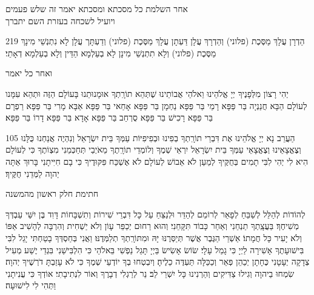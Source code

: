 \clearpage

\centerlastline
{
\small
\parskip 1pt
{\centering
  \scriptsize
   אחר השלמת כל מסכתא ומסכתא יאמר זה שלש פעמים\\ ויועיל לשכחה בעזרת השם יתברך\hdot
}

\begin{tp}{219}
הַדְרָן עֲלָךְ מַסֶּכֶת {\scriptsize(פלוני)} וְהַדְרָךְ עֲלָן\hdot
דַּעְתָן עֲלָךְ מַסֶּכֶת {\scriptsize(פלוני)} וְדַעְתָּך עֲלָן\hdot
לָא נִתְנְשֵׁי מִינָךְ מַסֶּכֶת {\scriptsize(פלוני}) וְלָא תִתְנְשֵׁי מִינָן
לָא בְעַלְמָא הַדֵּין וְלָא בְעַלְמָא דְאָתֵי׃
\end{tp}

{\scriptsize ואחר כל יאמר}

יְהִי רָצוֹן מִלְּפָנֶיךָ יְיָ אֱלֹהֵינוּ וֵאלֹהֵי אֲבוֹתֵינוּ שֶׁתְּהֵא תוֹרָֽתְךָ אוּמָנוּתֵנוּ בָּעוֹלָם הַזֶּה וּתְהֵא עִמָּנו לְעוֹלָם הַבָּא\hdot
חֲנַנְיָה בַּר פַּפָּא\hdot
רָמֵי בַּר פַּפָּא\hdot
נַחְמָן בַּר פַּפָּא\hdot
אָחַאי בַּר פַּפָּא\hdot
אַבָּא מָרִי בַּר פַּפָּא\hdot
רַפְרָם בַּר פַּפָּא\hdot
רָכִישׁ בַּר פַּפָּא\hdot
סֻרְחַב בַּר פַּפָּא\hdot
אָדָא בַּר פַּפָּא\hdot
דָרוֹ בַּר פַּפָּא׃

\begin{tp}{105}
הַעֲרֵב נָא יְיָ אֱלֹהֵינוּ אֶת דִּבְרֵי תוֹרָֽתְךָ בְפִינוּ וּבְפִיפִיּוֹת עַמְּךָ בֵּית יִשְׂרָאֵל וְנִהְיֶה אֲנַחְנוּ כֻּלָּנוּ וְצֶאֱצָאֵינוּ וְצֶאֱצָאֵי עַמְּךָ בֵּית יִשְׂרָאֵל יִרְאֵי שְׁמֶךָ וְלוֹמְדֵי תוֹרָֽתֶךָ\hdot
 מֵאֹיְבַי תְּחַכְּמֵנִי מִצְו‍ֹתֶךָ כִּי לְעוֹלָם הִיא לִי\hdot
 יְהִי לִבִּי תָמִים בְּחֻקֶּיךָ לְמַעַן לֹא אֵבוֹשׁ\hdot
 לְעוֹלָם לֹא אֶשְׁכַּח פִּקּוּדֶיךָ כִּי בָם חִיִּיתָנִי\hdot
  בָּרוּךְ אַתָּה יְהוָה לַמְּדֵנִי חֻקֶּיךָ׃
\end{tp}
  
    {\centering
      \larger חתימת חלק ראשון מהמשנה

    }

    לְהוֹדוֹת לְהַלֵּל לְשַׁבֵּחַ לְפָאֵר לְרוֹמֵם לְהַדֵּר וּלְנַצֵּחַ עַל כָּל דִּבְרֵי שִׁירוֹת וְתִשְׁבָּחוֹת דָּוִד בֶּן יִשַּׁי עַבְדְּךָ מְשִׁיחֶךָ׃ בַּעֲצָֽתְךָ תַנְחֵנִי וְאַחַר כָּבוֹד תִּקָּחֵנִי׃
    וְהוּא רַחוּם יְכַפֵּר עָו‍ֹן וְלֹא יַשְׁחִית וְהִרְבָּה לְהָשִׁיב אַפּוֹ וְלֹא יָעִיר כָּל חֲמָתוֹ׃
    אַשְׁרֵי הַגֶּבֶר אֲשֶׁר תְּיַסְּרֶנּוּ יָּהּ וּמִתּוֹרָֽתְךָ תְלַמְּדֶנּוּ׃
    וַאֲנִי בְּחַסְדְּךָ בָטַחְתִּי יָגֵל לִבִּי בִּישׁוּעָתֶךָ אָשִׁירָה לַיְיָ כִּי גָמַל עָלָי׃
    שׂוֹשׂ אָשִׂישׂ בַּיְיָ תָּגֵל נַפְשִׁי בֵּאלֹהַי כִּי הִלְבִּישַׁנִי בִּגְדֵי יֶשַׁע מְעִיל צְדָקָה יְעָטָנִי כֶּחָתָן יְכַהֵן פְּאֵר וְכַכַּלָּה תַּעְדֶּה כֵלֶיהָ׃
    וְיִבְטְחוּ בְךָ יוֹדְעֵי שְׁמֶךָ כִּי לֹא עָזַבְתָּ דֹרְשֶׁיךָ יְהוָה׃
    שִׂמְחוּ בַיהוָה וְגִילוּ צַדִּיקִים וְהַרְנִינוּ כָּל יִשְׁרֵי לֵב׃
    נֵר לְרַגְלִי דְבָרֶךָ וְאוֹר לִנְתִיבָתִי׃
    אוֹדְךָ כִּי עֲנִיתָנִי וַתְּהִי לִי לִישׁוּעָה׃
    
}

